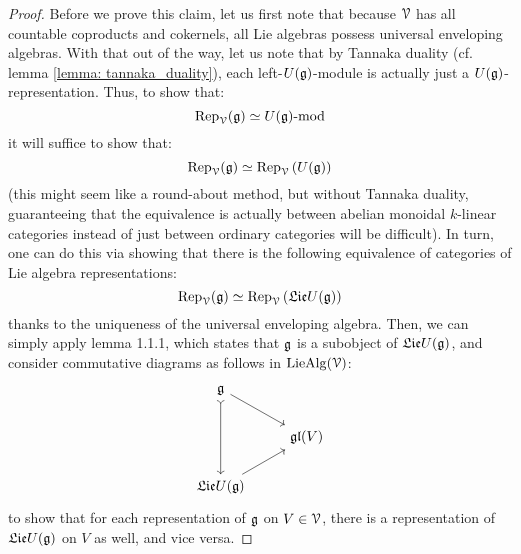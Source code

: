         \begin{proof}
            Before we prove this claim, let us first note that because $\mathcal{V}$ has all countable coproducts and cokernels, all Lie algebras possess universal enveloping algebras. With that out of the way, let us note that by Tannaka duality (cf. lemma \ref{lemma: tannaka_duality}), each left-$U(\mathfrak{g})$-module is actually just a $U(\mathfrak{g})$-representation. Thus, to show that:
                $$\mathrm{Rep}_{\mathcal{V}}(\mathfrak{g}) \simeq {U(\mathfrak{g})}\text{-}\mathrm{mod}$$
            it will suffice to show that:
                $$\mathrm{Rep}_{\mathcal{V}}(\mathfrak{g}) \simeq \mathrm{Rep}_{\mathcal{V}}\left(U(\mathfrak{g})\right)$$
            (this might seem like a round-about method, but without Tannaka duality, guaranteeing that the equivalence is actually between abelian monoidal $k$-linear categories instead of just between ordinary categories will be difficult). In turn, one can do this via showing that there is the following equivalence of categories of Lie algebra representations:
                $$\mathrm{Rep}_{\mathcal{V}}(\mathfrak{g}) \simeq \mathrm{Rep}_{\mathcal{V}}\left(\mathfrak{Lie} U(\mathfrak{g})\right)$$
            thanks to the uniqueness of the universal enveloping algebra. Then, we can simply apply lemma 1.1.1, which states that $\mathfrak{g}$ is a subobject of $\mathfrak{Lie} U(\mathfrak{g})$, and consider commutative diagrams as follows in $\mathrm{Lie}\mathrm{Alg}(\mathcal{V})$:
                $$
                    \begin{tikzcd}
                    	{\g} \\
                    	& {\frakgl(V)} \\
                    	{\frakLie U(\g)}
                    	\arrow[from=1-1, to=2-2]
                    	\arrow[from=3-1, to=2-2]
                    	\arrow[from=1-1, to=3-1, tail]
                    \end{tikzcd}
                $$
            to show that for each representation of $\mathfrak{g}$ on $V \in \mathcal{V}$, there is a representation of $\mathfrak{Lie} U(\mathfrak{g})$ on $V$ as well, and vice versa.
        \end{proof}